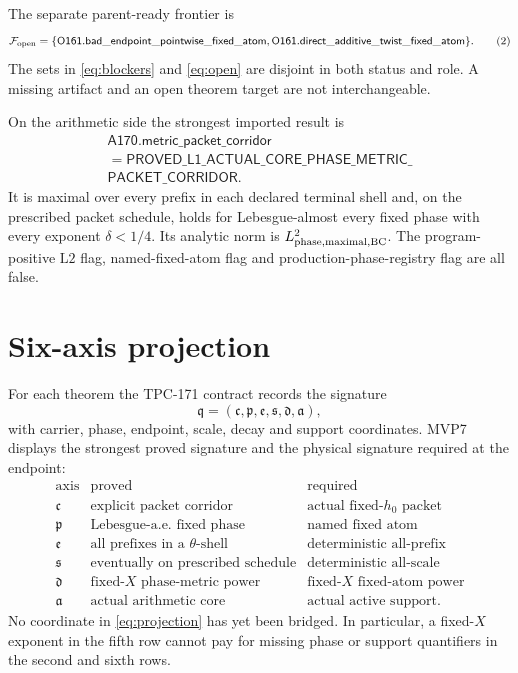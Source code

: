 \documentclass[11pt]{article}
\theoremstyle{definition}
\theoremstyle{remark}
\newcommand{\Ltwo}{\mathrm{L2}}
\begin{document}
The separate parent-ready frontier is
\[
\mathcal F_{\rm open}
=\{\mathsf{O161.bad\_endpoint\_pointwise\_fixed\_atom},
\mathsf{O161.direct\_additive\_twist\_fixed\_atom}\}.
\tag{2}\label{eq:open}
\]
The sets in \eqref{eq:blockers} and \eqref{eq:open} are disjoint in
both status and role.  A missing artifact and an open theorem target
are not interchangeable.

On the arithmetic side the strongest imported result is
\[
 \begin{gathered}
 \mathsf{A170.metric\_packet\_corridor}\\
 =
 \mathsf{PROVED\_L1\_ACTUAL\_CORE\_PHASE\_METRIC\_}\\[-2pt]
 \mathsf{PACKET\_CORRIDOR}.
 \end{gathered}
\tag{3}\label{eq:A170}
\]
It is maximal over every prefix in each declared terminal shell and,
on the prescribed packet schedule, holds for Lebesgue-almost every
fixed phase with every exponent \(\delta<1/4\).  Its analytic norm is
\(L^2_{\rm phase,maximal,BC}\).  The program-positive \(\Ltwo\) flag,
named-fixed-atom flag and production-phase-registry flag are all
false.

\section{Six-axis projection}

For each theorem the TPC-171 contract records the signature
\[
 \mathfrak q=(\mathfrak c,\mathfrak p,\mathfrak e,
              \mathfrak s,\mathfrak d,\mathfrak a),
\tag{4}\label{eq:q}
\]
with carrier, phase, endpoint, scale, decay and support coordinates.
MVP7 displays the strongest proved signature and the physical
signature required at the endpoint:
\[
\begin{array}{c|c|c}
\text{axis}&\text{proved}&\text{required}\\
\hline
\mathfrak c&\text{explicit packet corridor}&
             \text{actual fixed-}h_0\text{ packet}\\
\mathfrak p&\text{Lebesgue-a.e.\ fixed phase}&
             \text{named fixed atom}\\
\mathfrak e&\text{all prefixes in a }\theta\text{-shell}&
             \text{deterministic all-prefix}\\
\mathfrak s&\text{eventually on prescribed schedule}&
             \text{deterministic all-scale}\\
\mathfrak d&\text{fixed-}X\text{ phase-metric power}&
             \text{fixed-}X\text{ fixed-atom power}\\
\mathfrak a&\text{actual arithmetic core}&
             \text{actual active support}.
\end{array}
\tag{5}\label{eq:projection}
\]
No coordinate in \eqref{eq:projection} has yet been bridged.  In
particular, a fixed-\(X\) exponent in the fifth row cannot pay for
missing phase or support quantifiers in the second and sixth rows.
\end{document}
